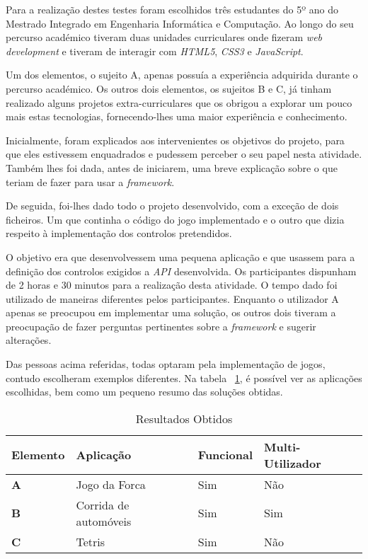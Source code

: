 	Para a realização destes testes foram escolhidos três estudantes do 5º ano do Mestrado Integrado em Engenharia Informática e Computação. Ao longo do seu percurso académico tiveram duas unidades curriculares onde fizeram \textit{web development} e tiveram de interagir com \textit{HTML5}, \textit{CSS3} e \textit{JavaScript}.

	Um dos elementos, o sujeito A, apenas possuía a experiência adquirida durante o percurso académico. Os outros dois elementos,  os sujeitos B e C, já tinham realizado alguns projetos extra-curriculares que os obrigou a explorar um pouco mais estas tecnologias, fornecendo-lhes uma maior experiência e conhecimento. 

	Inicialmente, foram explicados aos intervenientes os objetivos do projeto, para que eles estivessem enquadrados e pudessem perceber o seu papel nesta atividade. Também lhes foi dada, antes de iniciarem, uma breve explicação sobre o que teriam de fazer para usar a \textit{framework}.

	De seguida, foi-lhes dado todo o projeto desenvolvido, com a exceção de dois ficheiros. Um que continha o código do jogo implementado e o outro que dizia respeito à implementação dos controlos pretendidos.

	O objetivo era que desenvolvessem uma pequena aplicação e que usassem para a definição dos controlos exigidos a \textit{API} desenvolvida. Os participantes dispunham de 2 horas e 30 minutos para a realização desta atividade. O tempo dado foi utilizado de maneiras diferentes pelos participantes. Enquanto o utilizador A apenas se preocupou em implementar uma solução, os outros dois tiveram a preocupação de fazer perguntas pertinentes sobre a \textit{framework} e sugerir alterações.

	Das pessoas acima referidas, todas optaram pela implementação de jogos, contudo escolheram exemplos diferentes. Na tabela ~\ref{table:Resultados}, é possível ver as aplicações escolhidas, bem como um pequeno resumo das soluções obtidas.

	\begin{table}[ht]
	\centering
	\caption{Resultados Obtidos}
	\begin{tabular}{ l l l l }
	\hline
	\textbf{Elemento} & \textbf{Aplicação} & \textbf{Funcional} & \textbf{Multi-Utilizador} \\ 
	\hline
	\textbf{A} & Jogo da Forca & Sim & Não \\
	\hline
	\textbf{B} & Corrida de automóveis & Sim & Sim \\
	\hline
	\textbf{C} & Tetris & Sim & Não \\
	\hline
	\end{tabular}

	
	\label{table:Resultados}
	\end{table}

